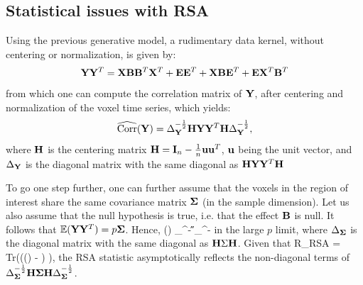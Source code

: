 \documentclass{article}
\begin{document}
\subsection{Statistical issues with RSA}
Using the previous generative model, a rudimentary data kernel,
without centering or normalization, is given by:
\begin{equation*} \mathbf{Y}\mathbf{Y}^T = \mathbf{X}\mathbf{B}\mathbf{B}^T\mathbf{X}^T + \mathbf{E}\mathbf{E}^T + \mathbf{X}\mathbf{B}\mathbf{E}^T + \mathbf{E}\mathbf{X}^T\mathbf{B}^T 
\end{equation*}
from which one can compute the correlation matrix of $\mathbf{Y}$, after 
centering and normalization of the voxel time series, which yields:
\begin{equation*}
\widehat{\text{Corr}}(\mathbf{Y}) = \Delta_{\mathbf{Y}}^{-\frac{1}{2}} \mathbf{H}\mathbf{Y}\mathbf{Y}^T\mathbf{H}
\Delta_{\mathbf{Y}}^{-\frac{1}{2}},
\end{equation*}
where $\mathbf{H}$ is the centering matrix $\mathbf{H}=\mathbf{I}_n - \frac{1}{n}\mathbf{u}\mathbf{u}^T$,
  $\mathbf{u}$ being the unit vector, and $\Delta_{\mathbf{Y}}$ is the diagonal
  matrix with the same diagonal as $\mathbf{H}\mathbf{Y}\mathbf{Y}^T\mathbf{H}$

To go one step further, one can further assume that the voxels in the
region of interest share the same %
 covariance matrix $\boldsymbol \Sigma$ (in the sample dimension). Let us also
 assume that the null hypothesis is true, i.e. that the effect $\mathbf{B}$ is
 null.
%
It follows that $\mathbb{E}(\mathbf{Y}\mathbf{Y}^T) = p\boldsymbol \Sigma$. Hence,
\beq {}(\Y) \rightarrow \Delta_{\BSig}^{-} \H\BSig\H
\Delta_{\BSig}^{-}\eeq 
in the large $p$ limit, where $\Delta_{\boldsymbol \Sigma}$ is the diagonal
  matrix with the same diagonal as $\mathbf{H}\Sigma\mathbf{H}$.  Given that
\beq 
R_{RSA} = Tr\left(((\Y) - \I) \K \right),\eeq
 the RSA statistic asymptotically reflects the non-diagonal terms of
$\Delta_{\boldsymbol \Sigma}^{-\frac{1}{2}} \mathbf{H}\boldsymbol \Sigma\mathbf{H} \Delta_{\boldsymbol \Sigma}^{-\frac{1}{2}}$.
\end{document}
